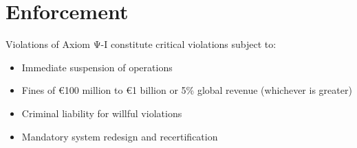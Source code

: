 \vspace{0.5cm}

\section{Enforcement}

Violations of Axiom Ψ-I constitute critical violations subject to:

\begin{itemize}
    \item Immediate suspension of operations
    \item Fines of €100 million to €1 billion or 5\% global revenue (whichever is greater)
    \item Criminal liability for willful violations
    \item Mandatory system redesign and recertification
\end{itemize}

\cleardoublepage
